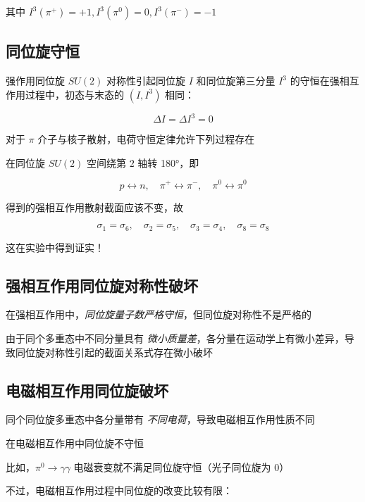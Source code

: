\documentclass[oneside,a4paper,openany,11pt]{ctexbook}
\begin{document}
其中 $I^3(\pi^+)=+1, I^3(\pi^0)=0, I^3(\pi^-)=-1$

\subsection{同位旋守恒}

强作用同位旋 $SU(2)$ 对称性引起同位旋 $I$ 和同位旋第三分量 $I^3$ 的守恒在强相互作用过程中，初态与末态的 $(I, I^3)$ 相同：

\begin{equation}
    \Delta I = \Delta I^3 = 0
\end{equation}

对于 $\pi$ 介子与核子散射，电荷守恒定律允许下列过程存在

在同位旋 $SU(2)$ 空间绕第 $2$ 轴转 \ang{180}，即

\begin{equation}
    p \leftrightarrow n, \quad \pi^+ \leftrightarrow \pi^-, \quad \pi^0 \leftrightarrow \pi^0
\end{equation}

得到的强相互作用散射截面应该不变，故

\begin{equation}
    \sigma_1 = \sigma_6, \quad \sigma_2 = \sigma_5, \quad \sigma_3 = \sigma_4, \quad \sigma_8 = \sigma_8
\end{equation}

这在实验中得到证实！

\subsection{强相互作用同位旋对称性破坏}

在强相互作用中，\emph{同位旋量子数严格守恒}，但同位旋对称性不是严格的

由于同个多重态中不同分量具有 \emph{微小质量差}，各分量在运动学上有微小差异，导致同位旋对称性引起的截面关系式存在微小破坏

\subsection{电磁相互作用同位旋破坏}

同个同位旋多重态中各分量带有 \emph{不同电荷}，导致电磁相互作用性质不同

在电磁相互作用中同位旋不守恒

比如，$\pi^0 \to \gamma\gamma$ 电磁衰变就不满足同位旋守恒（光子同位旋为 $0$）

不过，电磁相互作用过程中同位旋的改变比较有限：
\end{document}
